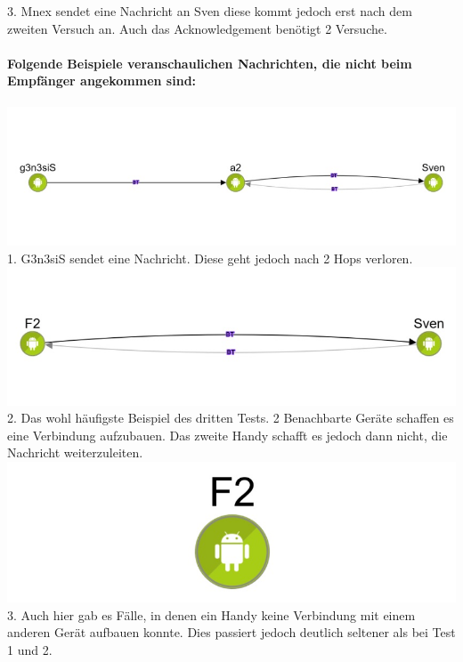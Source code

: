 3. Mnex sendet eine Nachricht an Sven diese kommt jedoch erst nach dem
zweiten Versuch an. Auch das Acknowledgement benötigt 2 Versuche.

\paragraph*{Folgende Beispiele veranschaulichen Nachrichten, die nicht beim
Empfänger angekommen sind:}

\includegraphics[width=1.0\textwidth]{belege/grosstests/Bilder/Grosstest2/Test3Misserfolg1.jpg}\\
1. G3n3siS sendet eine Nachricht. Diese geht jedoch nach 2 Hops verloren.\\

\includegraphics[width=1.0\textwidth]{belege/grosstests/Bilder/Grosstest2/Test3Misserfolg2.jpg}\\
2. Das wohl häufigste Beispiel des dritten Tests. 2 Benachbarte Geräte
schaffen es eine Verbindung aufzubauen. Das zweite Handy schafft es
jedoch dann nicht, die Nachricht weiterzuleiten.\\


\includegraphics[width=1.0\textwidth]{belege/grosstests/Bilder/Grosstest2/Test3Misserfolg3.jpg}\\
3. Auch hier gab es Fälle, in denen ein Handy keine Verbindung mit einem anderen Gerät aufbauen konnte. Dies passiert jedoch deutlich seltener als bei Test 1 und 2. \\
